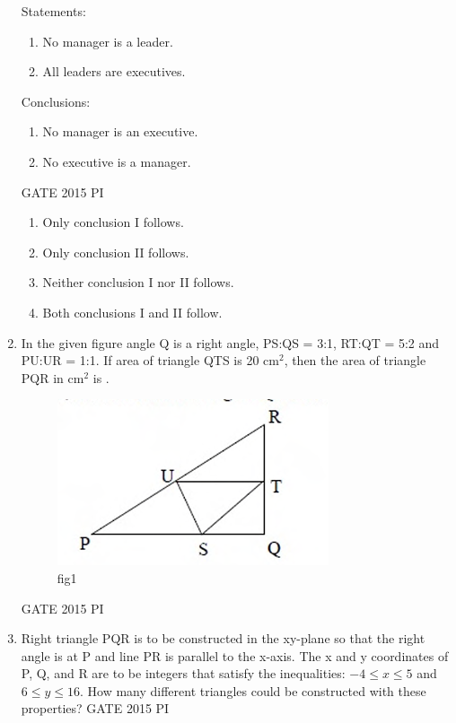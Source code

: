 \documentclass[journal,12pt,onecolumn]{IEEEtran}
\theoremstyle{remark}
\begin{document}
\begin{enumerate}
Statements:
\begin{enumerate}
    \item No manager is a leader.
    \item All leaders are executives.
\end{enumerate}

Conclusions:
\begin{enumerate}
    \item No manager is an executive.
    \item No executive is a manager.
\end{enumerate}

\hfill{GATE 2015 PI}

\begin{multicols}{2}
\begin{enumerate}
    \item Only conclusion I follows.
    \item Only conclusion II follows.
    \item Neither conclusion I nor II follows.
    \item Both conclusions I and II follow.
\end{enumerate}
\end{multicols}
\item In the given figure angle Q is a right angle, PS:QS = 3:1, RT:QT = 5:2 and PU:UR = 1:1. If area of triangle QTS is 20 cm$^2$, then the area of triangle PQR in cm$^2$ is \underline{\hspace{3cm}}.

\begin{figure}[H]
    \centering
    \includegraphics[width=0.5\linewidth]{figs/Q.8.png}
    \caption{fig1}
    \label{fig:figs/Q.8.png}
\end{figure}
\hfill{GATE 2015 PI}

\item Right triangle PQR is to be constructed in the xy-plane so that the right angle is at P and line PR is parallel to the x-axis. The x and y coordinates of P, Q, and R are to be integers that satisfy the inequalities: $-4 \leq x \leq 5$ and $6 \leq y \leq 16$. How many different triangles could be constructed with these properties?
\hfill{GATE 2015 PI}


\end{enumerate}
\end{document}
